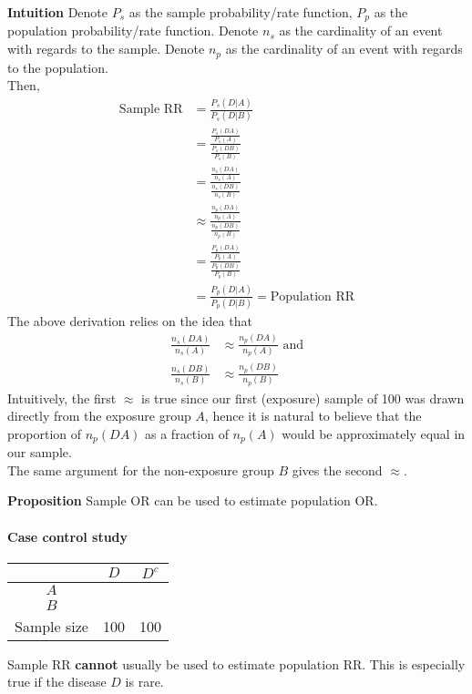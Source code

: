\documentclass{article}
\begin{document}
\textbf{Intuition} Denote $P_s$ as the sample probability/rate function, $P_p$ as the population probability/rate function. Denote $n_s$ as the cardinality of an event with regards to the sample. Denote $n_p$ as the cardinality of an event with regards to the population.\\
Then,
\begin{align*}
	\text{Sample RR}&=\frac{P_s(D|A)}{P_s(D|B)}\\
	&=\frac{\frac{P_s(DA)}{P_s(A)}}{\frac{P_s(DB)}{P_s(B)}}\\
	&=\frac{\frac{n_s(DA)}{n_s(A)}}{\frac{n_s(DB)}{n_s(B)}}\\
	&\approx \frac{\frac{n_p(DA)}{n_p(A)}}{\frac{n_p(DB)}{n_p(B)}}\\
	&=\frac{\frac{P_p(DA)}{P_p(A)}}{\frac{P_p(DB)}{P_p(B)}}\\
	&=\frac{P_p(D|A)}{P_p(D|B)}=\text{Population RR}
\end{align*}
The above derivation relies on the idea that
\begin{align*}
	\frac{n_s(DA)}{n_s(A)}&\approx \frac{n_p(DA)}{n_p(A)} \text{ and}\\
	\frac{n_s(DB)}{n_s(B)}&\approx \frac{n_p(DB)}{n_p(B)}
\end{align*}
Intuitively, the first $\approx$ is true since our first (exposure) sample of 100 was drawn directly from the exposure group $A$, hence it is natural to believe that the proportion of $n_p(DA)$ as a fraction of $n_p(A)$ would be approximately equal in our sample.\\
The same argument for the non-exposure group $B$ gives the second $\approx$.

\textbf{Proposition} Sample OR can be used to estimate population OR.

\paragraph{Case control study}
\begin{center}
	\begin{tabular}{c|c|c|}
	& $D$ & $D^c$\\
	\hline
	$A$ & & \\
	\hline
	$B$ & & \\
	\hline
	Sample size & 100 & 100\\
	\hline
	\end{tabular}
\end{center}

Sample RR \textbf{cannot} usually be used to estimate population RR. This is especially true if the disease $D$ is rare.
\end{document}
